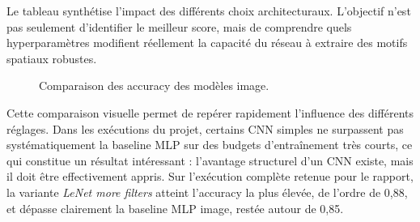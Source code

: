 \begin{table}[H]
    \centering
    \caption{Comparaison des expériences réalisées sur Fashion-MNIST.}
\end{table}
Le tableau synthétise l’impact des différents choix architecturaux. L’objectif n’est pas seulement d’identifier le meilleur score, mais de comprendre quels hyperparamètres modifient réellement la capacité du réseau à extraire des motifs spatiaux robustes.

\begin{figure}[H]
    \centering
    \caption{Comparaison des accuracy des modèles image.}
\end{figure}
Cette comparaison visuelle permet de repérer rapidement l’influence des différents réglages. Dans les exécutions du projet, certains CNN simples ne surpassent pas systématiquement la baseline MLP sur des budgets d’entraînement très courts, ce qui constitue un résultat intéressant : l’avantage structurel d’un CNN existe, mais il doit être effectivement appris.
Sur l’exécution complète retenue pour le rapport, la variante \emph{LeNet more filters} atteint l’accuracy la plus élevée, de l’ordre de 0,88, et dépasse clairement la baseline MLP image, restée autour de 0,85.

